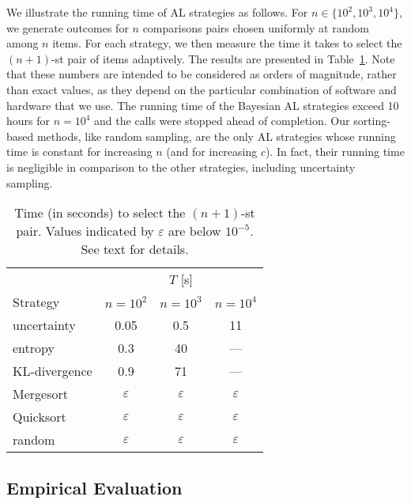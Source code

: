 We illustrate the running time of AL strategies as follows.
For $n \in \{10^2, 10^3, 10^4 \}$, we generate outcomes for $n$ comparisons pairs chosen uniformly at random among $n$ items.
For each strategy, we then measure the time it takes to select the $(n\!+\!1)$-st pair of items adaptively.
The results are presented in Table~\ref{rs:tab:runningtime}.
Note that these numbers are intended to be considered as orders of magnitude, rather than exact values, as they depend on the particular combination of software and hardware that we use.
The running time of the Bayesian AL strategies exceed \num{10} hours for $n = 10^4$ and the calls were stopped ahead of completion.
Our sorting-based methods, like random sampling, are the only AL strategies whose running time is constant for increasing $n$ (and for increasing $c$).
In fact, their running time is negligible in comparison to the other strategies, including uncertainty sampling.

\begin{table}[t]
  \caption{
Time (in seconds) to select the $(n\!+\!1)$-st pair.
Values indicated by $\varepsilon$ are below $10^{-5}$.
See text for details.
}
  \vspace{2mm}
  \label{rs:tab:runningtime}
  \centering
  \begin{tabular}{l ccc}
    \toprule
                  & \multicolumn{3}{c}{$T$ [s]} \\
                    \cmidrule(l){2-4}
    Strategy      & $n = 10^2$ & $n = 10^3$ & $n = 10^4$ \\
    \midrule
    uncertainty   & \num{0.05}      & \num{0.5}        & \num{11}      \\
    entropy       & \num{0.3}       & \num{40}         & ---           \\
    KL-divergence & \num{0.9}       & \num{71}         & ---           \\
    Mergesort     & $\varepsilon$   & $\varepsilon$    & $\varepsilon$ \\
    Quicksort     & $\varepsilon$   & $\varepsilon$    & $\varepsilon$ \\
    random        & $\varepsilon$   & $\varepsilon$    & $\varepsilon$ \\
    \bottomrule
  \end{tabular}
\end{table}


\subsection{Empirical Evaluation}

